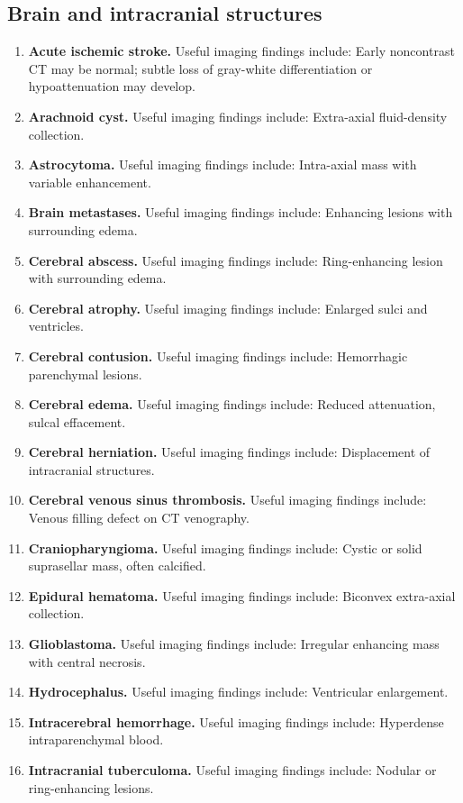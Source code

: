\subsection{Brain and intracranial structures}
\begin{enumerate}[leftmargin=*,itemsep=0.45em,topsep=0.4em]
\item \textbf{Acute ischemic stroke.} Useful imaging findings include: Early noncontrast CT may be normal; subtle loss of gray-white differentiation or hypoattenuation may develop.
\item \textbf{Arachnoid cyst.} Useful imaging findings include: Extra-axial fluid-density collection.
\item \textbf{Astrocytoma.} Useful imaging findings include: Intra-axial mass with variable enhancement.
\item \textbf{Brain metastases.} Useful imaging findings include: Enhancing lesions with surrounding edema.
\item \textbf{Cerebral abscess.} Useful imaging findings include: Ring-enhancing lesion with surrounding edema.
\item \textbf{Cerebral atrophy.} Useful imaging findings include: Enlarged sulci and ventricles.
\item \textbf{Cerebral contusion.} Useful imaging findings include: Hemorrhagic parenchymal lesions.
\item \textbf{Cerebral edema.} Useful imaging findings include: Reduced attenuation, sulcal effacement.
\item \textbf{Cerebral herniation.} Useful imaging findings include: Displacement of intracranial structures.
\item \textbf{Cerebral venous sinus thrombosis.} Useful imaging findings include: Venous filling defect on CT venography.
\item \textbf{Craniopharyngioma.} Useful imaging findings include: Cystic or solid suprasellar mass, often calcified.
\item \textbf{Epidural hematoma.} Useful imaging findings include: Biconvex extra-axial collection.
\item \textbf{Glioblastoma.} Useful imaging findings include: Irregular enhancing mass with central necrosis.
\item \textbf{Hydrocephalus.} Useful imaging findings include: Ventricular enlargement.
\item \textbf{Intracerebral hemorrhage.} Useful imaging findings include: Hyperdense intraparenchymal blood.
\item \textbf{Intracranial tuberculoma.} Useful imaging findings include: Nodular or ring-enhancing lesions.

\end{enumerate}
